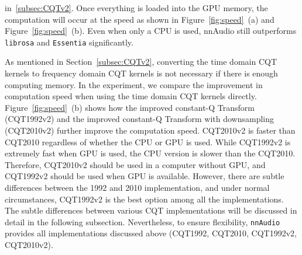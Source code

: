 \documentclass{ieeeaccess}
\newcommand{\nbh}[1]{\texttt{#1}}
\begin{document}
in~\ref{subsec:CQTv2}. Once everything is loaded into the GPU memory, the computation will occur at the speed as shown in Figure~\ref{fig:speed}~(a) and Figure~\ref{fig:speed}~(b). Even when only a CPU is used, nnAudio still outperforms \nbh{librosa} and \nbh{Essentia} significantly. 


As mentioned in Section~\ref{subsec:CQTv2}, converting the time domain CQT kernels to frequency domain CQT kernels is not necessary if there is enough computing memory. In the experiment, we compare the improvement in computation speed when using the time domain CQT kernels directly. Figure~\ref{fig:speed}~(b) shows how the improved constant-Q Transform (CQT1992v2) and the improved constant-Q Transform with downsampling (CQT2010v2) further improve the computation speed. CQT2010v2 is faster than CQT2010 regardless of whether the CPU or GPU is used. While CQT1992v2 is extremely fast when GPU is used, the CPU version is slower than the CQT2010. Therefore, CQT2010v2 should be used in a computer without GPU, and CQT1992v2 should be used when GPU is available. However, there are subtle differences between the 1992 and 2010 implementation, and under normal circumstances, CQT1992v2 is the best option among all the implementations. The subtle differences between various CQT implementations will be discussed in detail in the following subsection. Nevertheless, to ensure flexibility, \nbh{nnAudio} provides all implementations discussed above (CQT1992, CQT2010, CQT1992v2, CQT2010v2). 
\end{document}
